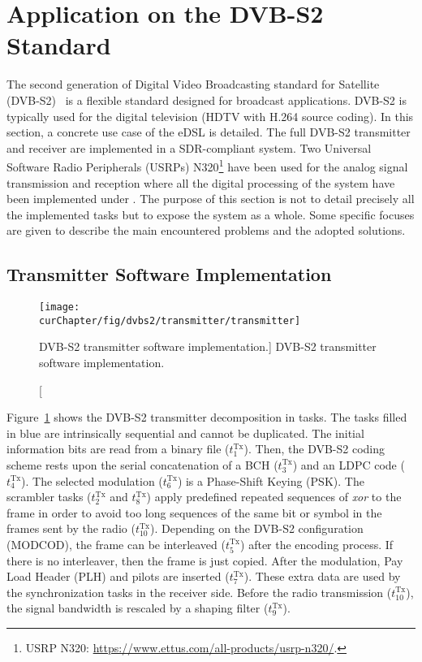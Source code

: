 \section{Application on the DVB-S2 Standard}

The second generation of Digital Video Broadcasting standard for Satellite
(DVB-S2)~\cite{ETSI2005} is a flexible standard designed for broadcast
applications. DVB-S2 is typically used for the digital television (HDTV with
H.264 source coding). In this section, a concrete use case of the \AFFECT eDSL
is detailed. The full DVB-S2 transmitter and receiver are implemented in a
SDR-compliant system. Two Universal Software Radio Peripherals (USRPs)
N320\footnote{USRP N320: \url{https://www.ettus.com/all-products/usrp-n320/}.}
have been used for the analog signal transmission and reception where all
the digital processing of the system have been implemented under \AFFECT. The
purpose of this section is not to detail precisely all the implemented tasks
but to expose the system as a whole. Some specific focuses are given to describe
the main encountered problems and the adopted solutions.

\subsection{Transmitter Software Implementation}

\begin{figure}[htp]
  \centering
  \texttt{[image: \\curChapter/fig/dvbs2/transmitter/transmitter]}
  \caption
    [DVB-S2 transmitter software implementation.]
    {DVB-S2 transmitter software implementation.}
  \label{fig:sdr_dvbs2_transmitter}
\end{figure}

Figure~\ref{fig:sdr_dvbs2_transmitter} shows the DVB-S2 transmitter
decomposition in tasks. The tasks filled in blue are intrinsically sequential
and cannot be duplicated. The initial information bits are read from a binary
file ($t^\text{Tx}_1$). Then, the DVB-S2 coding scheme rests upon the serial
concatenation of a BCH ($t^\text{Tx}_3$) and an LDPC code ($t^\text{Tx}_4$). The
selected modulation ($t^\text{Tx}_6$) is a Phase-Shift Keying (PSK). The
scrambler tasks ($t^\text{Tx}_2$ and $t^\text{Tx}_8$) apply predefined repeated
sequences of \emph{xor} to the frame in order to avoid too long sequences of the
same bit or symbol in the frames sent by the radio ($t^\text{Tx}_{10}$).
Depending on the DVB-S2 configuration (MODCOD), the frame can be interleaved
($t^\text{Tx}_5$) after the encoding process. If there is no interleaver, then
the frame is just copied. After the modulation, Pay Load Header (PLH) and
pilots are inserted ($t^\text{Tx}_7$). These extra data are used by the
synchronization tasks in the receiver side. Before the radio transmission
($t^\text{Tx}_{10}$), the signal bandwidth is rescaled by a shaping filter
($t^\text{Tx}_9$).

